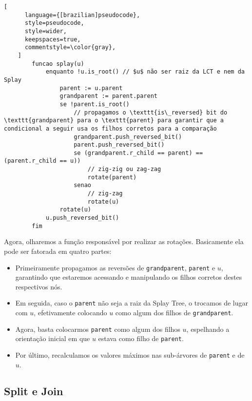 \begin{programruledcaption}{\label{splay:splay}}
    \begin{lstlisting}[
      language={[brazilian]pseudocode},
      style=pseudocode,
      style=wider,
      keepspaces=true,
      commentstyle=\color{gray},
    ]
        funcao splay(u)
            enquanto !u.is_root() // $u$ não ser raiz da LCT e nem da Splay
                parent := u.parent
                grandparent := parent.parent
                se !parent.is_root()
                    // propagamos o \texttt{is\_reversed} bit do \texttt{grandparent} para o \texttt{parent} para garantir que a condicional a seguir usa os filhos corretos para a comparação
                    grandparent.push_reversed_bit()
                    parent.push_reversed_bit()
                    se (grandparent.r_child == parent) == (parent.r_child == u))
                        // zig-zig ou zag-zag
                        rotate(parent)
                    senao
                        // zig-zag
                        rotate(u)
                rotate(u)
            u.push_reversed_bit()
        fim
    \end{lstlisting}
\end{programruledcaption}

Agora, olharemos a função responsável por realizar as rotações. Basicamente ela pode ser fatorada em quatro partes:

\begin{itemize}
    \item Primeiramente propagamos as reversões de \texttt{grandparent}, \texttt{parent} e $u$, garantindo que estaremos acessando e manipulando os filhos corretos destes respectivos nós.
    \item Em seguida, caso o \texttt{parent} não seja a raiz da Splay Tree, o trocamos  de lugar com $u$, efetivamente colocando $u$ como algum dos filhos de \texttt{grandparent}.
    \item Agora, basta colocarmos \texttt{parent} como algum dos filhos $u$, espelhando a orientação inicial em que $u$ estava como filho de \texttt{parent}.
    \item Por último, recalculamos os valores máximos nas sub-árvores de \texttt{parent} e de $u$.
\end{itemize}

\subsection{Split e Join}
\label{subsection:lct-splay-split-join}

